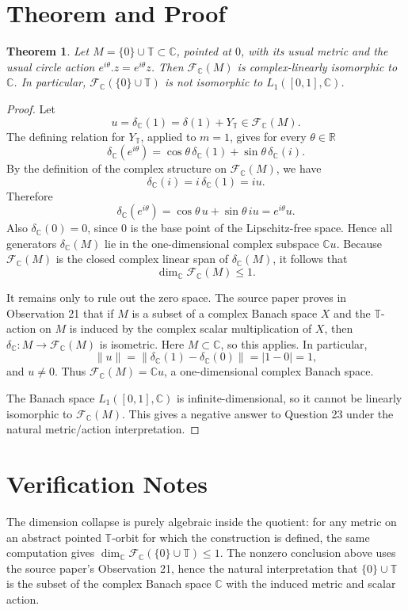 \documentclass[11pt]{article}
\newtheorem{theorem}{Theorem}
\newcommand{\F}{\mathcal F}
\newcommand{\T}{\mathbb T}
\newcommand{\C}{\mathbb C}
\begin{document}
\section*{Theorem and Proof}

\begin{theorem}
Let \(M=\{0\}\cup\T\subset\C\), pointed at \(0\), with its usual metric and the usual circle
action \(e^{i\theta}.z=e^{i\theta}z\).  Then \(\F_\C(M)\) is complex-linearly isomorphic
to \(\C\).  In particular, \(\F_\C(\{0\}\cup\T)\) is not isomorphic to \(L_1([0,1],\C)\).
\end{theorem}

\begin{proof}
Let
\[
u=\delta_\C(1)=\delta(1)+Y_\T\in \F_\C(M).
\]
The defining relation for \(Y_\T\), applied to \(m=1\), gives for every \(\theta\in\mathbb R\)
\[
\delta_\C(e^{i\theta})
=\cos\theta\,\delta_\C(1)+\sin\theta\,\delta_\C(i).
\]
By the definition of the complex structure on \(\F_\C(M)\), we have
\[
\delta_\C(i)=i\,\delta_\C(1)=iu.
\]
Therefore
\[
\delta_\C(e^{i\theta})
=\cos\theta\,u+\sin\theta\,iu
=e^{i\theta}u .
\]
Also \(\delta_\C(0)=0\), since \(0\) is the base point of the Lipschitz-free space.  Hence
all generators \(\delta_\C(M)\) lie in the one-dimensional complex subspace \(\C u\).
Because \(\F_\C(M)\) is the closed complex linear span of \(\delta_\C(M)\), it follows that
\[
\dim_\C \F_\C(M)\leq 1.
\]

It remains only to rule out the zero space.  The source paper proves in Observation 21 that
if \(M\) is a subset of a complex Banach space \(X\) and the \(\T\)-action on \(M\) is induced
by the complex scalar multiplication of \(X\), then \(\delta_\C:M\to\F_\C(M)\) is isometric.
Here \(M\subset \C\), so this applies.  In particular,
\[
\|u\|=\|\delta_\C(1)-\delta_\C(0)\|=|1-0|=1,
\]
and \(u\neq 0\).  Thus \(\F_\C(M)=\C u\), a one-dimensional complex Banach space.

The Banach space \(L_1([0,1],\C)\) is infinite-dimensional, so it cannot be linearly
isomorphic to \(\F_\C(M)\).  This gives a negative answer to Question 23 under the natural
metric/action interpretation.
\end{proof}

\section*{Verification Notes}

The dimension collapse is purely algebraic inside the quotient: for any metric on an abstract
pointed \(\T\)-orbit for which the construction is defined, the same computation gives
\(\dim_\C \F_\C(\{0\}\cup\T)\leq 1\).  The nonzero conclusion above uses the source paper's
Observation 21, hence the natural interpretation that \(\{0\}\cup\T\) is the subset of the
complex Banach space \(\C\) with the induced metric and scalar action.
\end{document}
